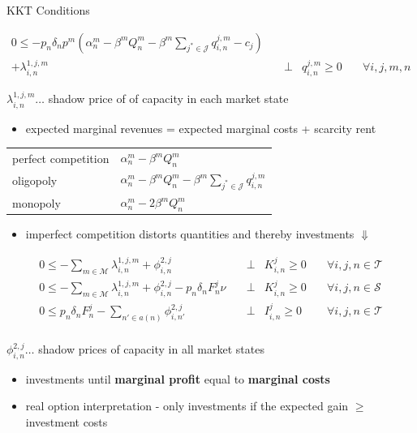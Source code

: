 \begin{frame}[allowframebreaks]{KKT Conditions}
  
\begin{align*}
0\leq - p_n\delta_np^m\left(\alpha_n^m-\beta^m Q_n^m-\beta^m\sum_{j^*\in \mathcal{J}}q_{i,n}^{j,m}-c_j\right) \nonumber\\
+\lambda_{i,n}^{1,j,m} &\quad\bot&q_{i,n}^{j,m}\geq 0&  \quad \forall i,j,m,n\label{eq:kkt_first}
\end{align*}

$\lambda_{i,n}^{1,j,m}\dots$ shadow price of of capacity in each market state

\vspace{0.5cm}

\begin{itemize}
  \item expected marginal revenues = expected marginal costs + scarcity rent
\end{itemize}

\begin{center}
\begin{tabular}{ll}
\hline
perfect competition &$\alpha_n^m-\beta^m Q_n^m$ \\
oligopoly & $\alpha_n^m-\beta^m Q_n^m-\beta^m\sum_{j^*\in \mathcal{J}}q_{i,n}^{j,m}$  \\
monopoly   & $\alpha_n^m-2\beta^m Q_n^m$  \\
\hline
\end{tabular}
\end{center}


\begin{itemize}
	\item imperfect competition distorts quantities and thereby investments $\Downarrow$
\end{itemize}

\framebreak

\begin{align*}
  0 \leq -\sum_{m\in\mathcal{M}}\lambda_{i,n}^{1,j,m}  +\phi_{i,n}^{2,j} &\quad\bot&K_{i,n}^{j}\geq 0&  \quad \forall i,j,n\in\mathcal{T}\\
0 \leq -\sum_{m\in\mathcal{M}}\lambda_{i,n}^{1,j,m}  +\phi_{i,n}^{2,j}-p_n\delta_nF_n^j\nu &\quad\bot&K_{i,n}^{j}\geq 0&  \quad \forall i,j,n\in\mathcal{S}\\
0\leq p_n\delta_nF_n^{j} - \sum_{n'\in a(n)}\phi_{i,n'}^{2,j} &\quad\bot&I_{i,n}^{j}\geq 0&  \quad \forall i,j,n\in\mathcal{T}\\
\end{align*}

$\phi_{i,n}^{2,j}\dots$ shadow prices of capacity in all market states

\vspace{0.5cm}

\begin{itemize}
	\item investments until \textbf{marginal profit} equal to \textbf{marginal costs}
	\item real option interpretation - only investments if the expected gain $\geq$ investment costs
\end{itemize}




\end{frame}

